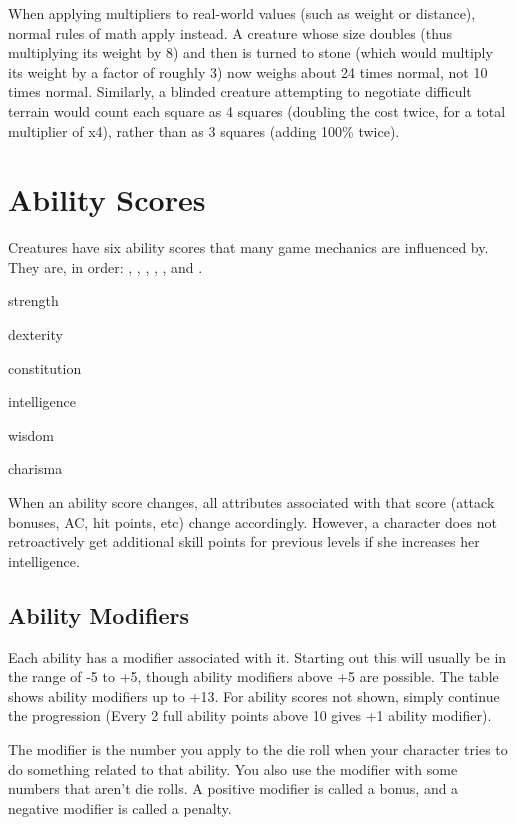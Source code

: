 When applying multipliers to real-world values (such as weight or distance), normal rules of math apply instead. A creature whose size doubles (thus multiplying its weight by 8) and then is turned to stone (which would multiply its weight by a factor of roughly 3) now weighs about 24 times normal, not 10 times normal. Similarly, a blinded creature attempting to negotiate difficult terrain would count each square as 4 squares (doubling the cost twice, for a total multiplier of x4), rather than as 3 squares (adding 100\% twice).

\section{Ability Scores}
Creatures have six ability scores that many game mechanics are influenced by. They are, in order: , , , , , and .

\glsdesc{strength}

\glsdesc{dexterity}

\glsdesc{constitution}

\glsdesc{intelligence}

\glsdesc{wisdom}

\glsdesc{charisma}

When an ability score changes, all attributes associated with that score (attack bonuses, AC, hit points, etc) change accordingly. However, a character does not retroactively get additional skill points for previous levels if she increases her intelligence.

\subsection{Ability Modifiers}
Each ability has a modifier associated with it. Starting out this will usually be in the range of -5 to +5, though ability modifiers above +5 are possible. The table shows ability modifiers up to +13. For ability scores not shown, simply continue the progression (Every 2 full ability points above 10 gives +1 ability modifier).

The modifier is the number you apply to the die roll when your character tries to do something related to that ability. You also use the modifier with some numbers that aren't die rolls. A positive modifier is called a bonus, and a negative modifier is called a penalty.

